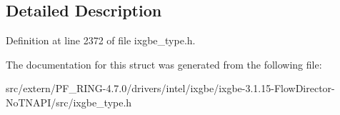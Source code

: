 \subsection{Detailed Description}


Definition at line 2372 of file ixgbe\_\-type.h.



The documentation for this struct was generated from the following file:\begin{DoxyCompactItemize}
\item 
src/extern/PF\_\-RING-\/4.7.0/drivers/intel/ixgbe/ixgbe-\/3.1.15-\/FlowDirector-\/NoTNAPI/src/ixgbe\_\-type.h\end{DoxyCompactItemize}
